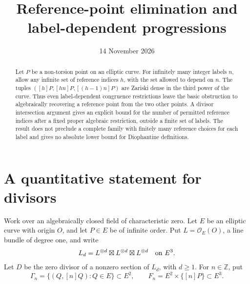 \documentclass[10pt,a4paper]{article}
\title{Reference-point elimination and label-dependent progressions}
\author{}\date{14 November 2026}
\newcommand{\Z}{\mathbb Z}\newcommand{\Q}{\mathbb Q}
\begin{document}
\maketitle
\begin{abstract}
Let $P$ be a non-torsion point on an elliptic curve. For infinitely many
integer labels $n$, allow any infinite set of reference indices $h$,
with the set allowed to depend on $n$. The tuples
$([h]P,[hn]P,[(h-1)n]P)$ are Zariski dense in the third power of the
curve. Thus even label-dependent congruence restrictions leave the
basic obstruction to algebraically recovering a reference point from
the two other points. A divisor intersection argument gives an
explicit bound for the number of permitted reference indices after a
fixed proper algebraic restriction, outside a finite set of labels.
The result does not preclude a complete family with finitely many
reference choices for each label and gives no absolute lower bound
for Diophantine definitions.
\end{abstract}

\section{A quantitative statement for divisors}
Work over an algebraically closed field of characteristic zero.
Let $E$ be an elliptic curve with origin $O$, and let $P\in E$ be of
infinite order. Put $L=\mathcal O_E(O)$, a line bundle of degree one,
and write
\[
 L_d=L^{\otimes d}\boxtimes L^{\otimes d}\boxtimes L^{\otimes d}
 \quad\hbox{on }E^3.
\]
Let $D$ be the zero divisor of a nonzero section of $L_d$, with $d\ge1$.
For $n\in\Z$, put
\[
 \Gamma_n=\{(Q,[n]Q):Q\in E\}\subset E^2,
 \qquad F_n=E^2\times\{[n]P\}\subset E^3.
\]
\end{document}
